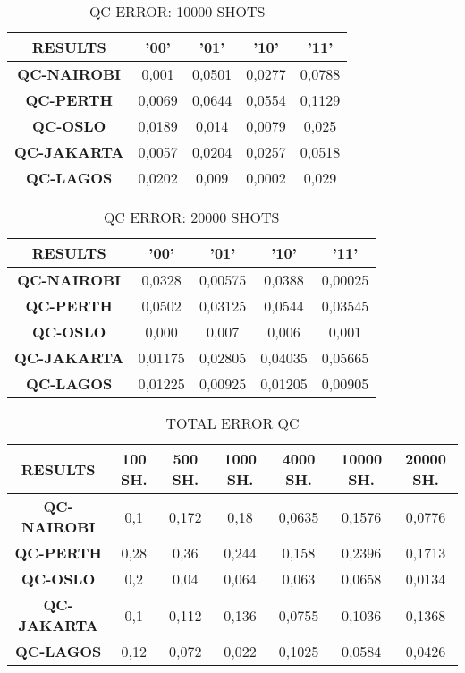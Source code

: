 \begin{table}[!ht]
    \centering
    \begin{tabular}{ccccc}
    \hline
        \textbf{RESULTS} & \textbf{'00'} & \textbf{'01'} & \textbf{'10'} & \textbf{'11' } \\ \hline
        \textbf{QC-NAIROBI} & 0,001 & 0,0501 & 0,0277 & 0,0788  \\ 
        \textbf{QC-PERTH} & 0,0069 & 0,0644 & 0,0554 & 0,1129  \\ 
        \textbf{QC-OSLO} & 0,0189 & 0,014 & 0,0079 & 0,025  \\ 
        \textbf{QC-JAKARTA} & 0,0057 & 0,0204 & 0,0257 & 0,0518  \\ 
        \textbf{QC-LAGOS} & 0,0202 & 0,009 & 0,0002 & 0,029 \\ \hline
    \end{tabular}
    \caption{QC ERROR: 10000 SHOTS}
\end{table}

\begin{table}[!ht]
    \centering
    \begin{tabular}{ccccc}
    \hline
        \textbf{RESULTS} & \textbf{'00'} & \textbf{'01'} & \textbf{'10'} & \textbf{'11' } \\ \hline
        \textbf{QC-NAIROBI} & 0,0328 & 0,00575 & 0,0388 & 0,00025  \\ 
        \textbf{QC-PERTH} & 0,0502 & 0,03125 & 0,0544 & 0,03545  \\ 
        \textbf{QC-OSLO} & 0,000 & 0,007 & 0,006 & 0,001  \\ 
        \textbf{QC-JAKARTA} & 0,01175 & 0,02805 & 0,04035 & 0,05665  \\ 
        \textbf{QC-LAGOS} & 0,01225 & 0,00925 & 0,01205 & 0,00905 \\ \hline
    \end{tabular}
    \caption{QC ERROR: 20000 SHOTS}
\end{table}


\begin{table}[!ht]
    \centering
    \begin{tabular}{ccccccc}
    \hline
        \textbf{RESULTS} & \textbf{100 SH.} & \textbf{500  SH.} & \textbf{1000 SH.} & \textbf{4000 SH.} & \textbf{10000 SH.} & \textbf{20000 SH.} \\ \hline
        \textbf{QC-NAIROBI} & 0,1 & 0,172 & 0,18 & 0,0635 & 0,1576 & 0,0776  \\ 
        \textbf{QC-PERTH} & 0,28 & 0,36 & 0,244 & 0,158 & 0,2396 & 0,1713  \\ 
        \textbf{QC-OSLO} & 0,2 & 0,04 & 0,064 & 0,063 & 0,0658 & 0,0134  \\ 
        \textbf{QC-JAKARTA} & 0,1 & 0,112 & 0,136 & 0,0755 & 0,1036 & 0,1368  \\ 
        \textbf{QC-LAGOS} & 0,12 & 0,072 & 0,022 & 0,1025 & 0,0584 & 0,0426 \\ \hline
    \end{tabular}
    \caption{TOTAL ERROR QC}
\end{table}



